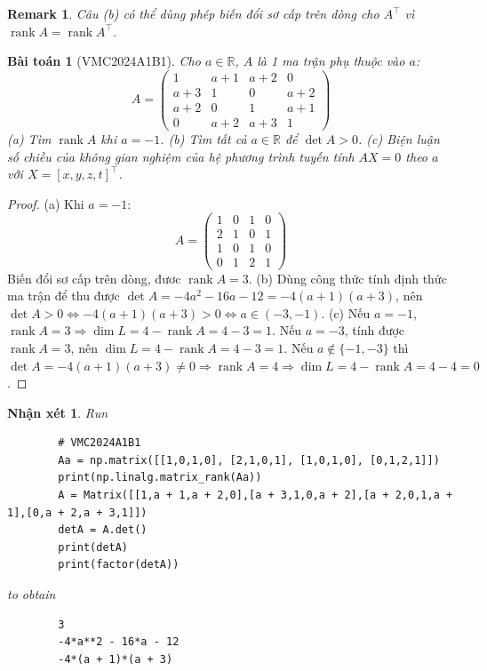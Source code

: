\documentclass{article}
\newtheorem{baitoan}{Bài toán}
\newtheorem{nhanxet}{Nhận xét}
\newtheorem{remark}{Remark}
\begin{document}
\begin{remark}
	Câu (b) có thể dùng phép biến đổi sơ cấp trên dòng cho $A^\top$ vì $\operatorname{rank}A = \operatorname{rank}A^\top$.
\end{remark}

\begin{baitoan}[VMC2024A1B1]
	Cho $a\in\mathbb{R}$, $A$ là 1 ma trận phụ thuộc vào $a$:
	\begin{equation}
		A = \begin{pmatrix}
			1 & a + 1 & a + 2 & 0\\a + 3 & 1 & 0 & a + 2\\a + 2 & 0 & 1 & a + 1\\0 & a + 2 & a + 3 & 1
		\end{pmatrix}
	\end{equation}
	(a) Tìm $\operatorname{rank}A$ khi $a = -1$. (b) Tìm tất cả $a\in\mathbb{R}$ để $\det A > 0$. (c) Biện luận số chiều của không gian nghiệm của hệ phương trình tuyến tính $AX = 0 $ theo $a$ với $X = [x,y,z,t]^\top$.
\end{baitoan}

\begin{proof}
	(a) Khi $a = -1$:
	\begin{equation}
		A = \begin{pmatrix}
			1 & 0 & 1 & 0\\2 & 1 & 0 & 1\\1 & 0 & 1 & 0\\0 &1 & 2 & 1
		\end{pmatrix}
	\end{equation}
	Biến đổi sơ cấp trên dòng, đươc $\operatorname{rank}A = 3$. (b) Dùng công thức tính định thức ma trận để thu được $\det A = -4a^2 - 16a - 12 = -4(a + 1)(a + 3)$, nên $\det A > 0\Leftrightarrow-4(a + 1)(a + 3) > 0\Leftrightarrow a\in(-3,-1)$. (c) Nếu $a = -1$, $\operatorname{rank}A = 3\Rightarrow\dim L = 4 - \operatorname{rank}A = 4 - 3 = 1$. Nếu $a = -3$, tính được $\operatorname{rank}A = 3$, nên $\dim L = 4 - \operatorname{rank}A = 4 - 3 = 1$. Nếu $a\notin\{-1,-3\}$ thì $\det A = -4(a + 1)(a + 3)\ne0\Rightarrow\operatorname{rank}A = 4\Rightarrow\dim L = 4 - \operatorname{rank}A = 4 - 4 = 0$.	
\end{proof}

\begin{nhanxet}
	Run
	\begin{verbatim}
		# VMC2024A1B1
		Aa = np.matrix([[1,0,1,0], [2,1,0,1], [1,0,1,0], [0,1,2,1]])
		print(np.linalg.matrix_rank(Aa))
		A = Matrix([[1,a + 1,a + 2,0],[a + 3,1,0,a + 2],[a + 2,0,1,a + 1],[0,a + 2,a + 3,1]])
		detA = A.det()
		print(detA)
		print(factor(detA))
	\end{verbatim}
	to obtain
	\begin{verbatim}
		3
		-4*a**2 - 16*a - 12
		-4*(a + 1)*(a + 3)
	\end{verbatim}
\end{nhanxet}
\end{document}
